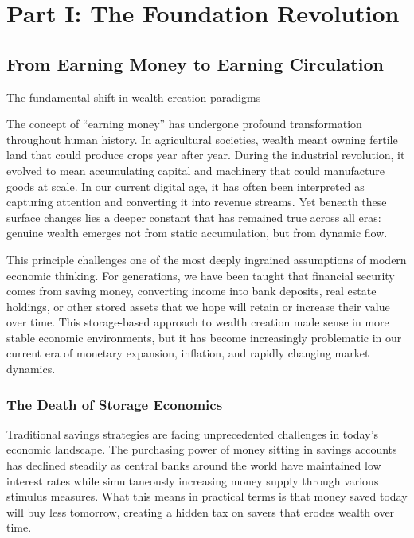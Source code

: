 \documentclass[
  Letterpaper,
]{scrbook}
\begin{document}
\part{Part I: The Foundation Revolution}

\chapter{From Earning Money to Earning
Circulation}\label{sec-earning-circulation}

The fundamental shift in wealth creation paradigms

The concept of ``earning money'' has undergone profound transformation
throughout human history. In agricultural societies, wealth meant owning
fertile land that could produce crops year after year. During the
industrial revolution, it evolved to mean accumulating capital and
machinery that could manufacture goods at scale. In our current digital
age, it has often been interpreted as capturing attention and converting
it into revenue streams. Yet beneath these surface changes lies a deeper
constant that has remained true across all eras: genuine wealth emerges
not from static accumulation, but from dynamic flow.

This principle challenges one of the most deeply ingrained assumptions
of modern economic thinking. For generations, we have been taught that
financial security comes from saving money, converting income into bank
deposits, real estate holdings, or other stored assets that we hope will
retain or increase their value over time. This storage-based approach to
wealth creation made sense in more stable economic environments, but it
has become increasingly problematic in our current era of monetary
expansion, inflation, and rapidly changing market dynamics.

\section{The Death of Storage
Economics}\label{the-death-of-storage-economics}

Traditional savings strategies are facing unprecedented challenges in
today's economic landscape. The purchasing power of money sitting in
savings accounts has declined steadily as central banks around the world
have maintained low interest rates while simultaneously increasing money
supply through various stimulus measures. What this means in practical
terms is that money saved today will buy less tomorrow, creating a
hidden tax on savers that erodes wealth over time.
\end{document}
